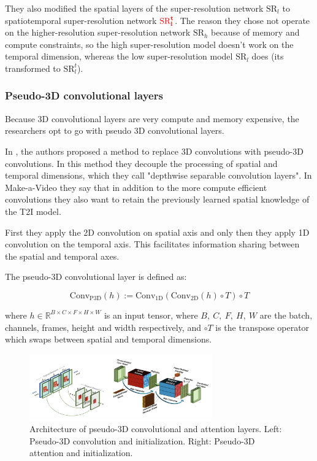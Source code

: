 They also modified the spatial layers of the super-resolution network $\text{SR}_l$ to spatiotemporal super-resolution network $\textcolor{red}{\mathbf{\text{SR}_l^t}}$. The reason they chose not operate on the higher-resolution super-resolution network $\text{SR}_h$ because of memory and compute constraints, so the high super-resolution model doesn't work on the temporal dimension, whereas the low super-resolution model $\text{SR}_l$ does (its transformed to $\text{SR}_l^t$).



\subsubsection{Pseudo-3D convolutional layers}

Because 3D convolutional layers are very compute and memory expensive, the researchers opt to go with pseudo 3D convolutional layers.

In \cite{chollet2017xception}, the authors proposed a method to replace 3D convolutions with pseudo-3D convolutions. In this method they decouple the processing of spatial and temporal dimensions, which they call "depthwise separable convolution layers". In Make-a-Video they say that in addition to the more compute efficient convolutions they also want to retain the previously learned spatial knowledge of the T2I model.

First they apply the 2D convolution on spatial axis and only then they apply 1D convolution on the temporal axis. This facilitates information sharing between the spatial and temporal axes.

The pseudo-3D convolutional layer is defined as:

\[ 
\text{Conv}_{\text{P3D}} (h) := \text{Conv}_{\text{1D}} (
    \text{Conv}_{\text{2D}} (h) \circ T
) \circ T \]

where $h \in \mathbb{R}^{B\times C\times F\times H\times W}$ is an input tensor, where $B,\ C,\ F,\ H,\ W$ are the batch, channels, frames, height and width respectively, and $\circ T$ is the transpose operator which swaps between spatial and temporal dimensions.

\begin{figure}
    \centering
    \includegraphics[width=0.7\textwidth]{images/make_a_video/pseudo_3d.png}
    \caption{Architecture of pseudo-3D convolutional and attention layers. Left: Pseudo-3D convolution and initialization. Right: Pseudo-3D attention and initialization.}
    \label{fig:make_a_video_pseudo_3d_conv_and_attention}
\end{figure}

